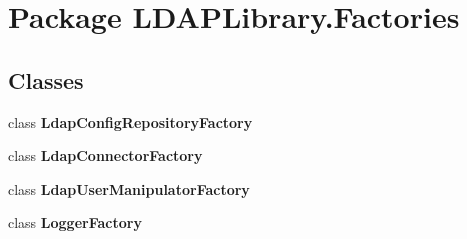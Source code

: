 \hypertarget{namespace_l_d_a_p_library_1_1_factories}{}\section{Package L\+D\+A\+P\+Library.\+Factories}
\label{namespace_l_d_a_p_library_1_1_factories}
\subsection*{Classes}
\begin{DoxyCompactItemize}
\item 
class {\bfseries Ldap\+Config\+Repository\+Factory}
\item 
class {\bfseries Ldap\+Connector\+Factory}
\item 
class {\bfseries Ldap\+User\+Manipulator\+Factory}
\item 
class {\bfseries Logger\+Factory}
\end{DoxyCompactItemize}
